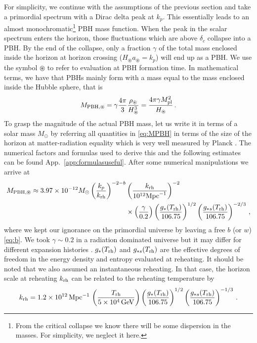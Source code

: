 \documentclass[a4paper,11pt]{article}
\numberwithin{equation}{section}
\begin{document}
For simplicity, we continue with the assumptions of the previous section and take a primordial spectrum with a Dirac delta peak at $k_p$. This essentially leads to an almost monochromatic\footnote{From the critical collapse we know there will be some dispersion in the masses. For simplicity, we neglect it here.} PBH mass function. When the peak in the scalar spectrum enters the horizon, those fluctuations which are above $\delta_c$ collapse into a PBH. By the end of the collapse, only a fraction $\gamma$ of the total mass enclosed inside the horizon at horizon crossing ($H_\circledast a_\circledast=k_p$) will end up as a PBH. We use the symbol $\circledast$ to refer to evaluation at PBH formation time. In mathematical terms, we have that PBHs mainly form with a mass equal to the mass enclosed inside the Hubble sphere, that is
\begin{equation}\label{eq:MPBH}
M_{{\rm PBH},\circledast}=\gamma\frac{4\pi}{3}\frac{\rho_\circledast}{H_\circledast^3}=\frac{4\pi\gamma M_{\rm pl}^2}{H_\circledast}\,.
\end{equation}
To grasp the magnitude of the actual PBH mass, let us write it in terms of a solar mass $M_\odot$ by referring all quantities in \eqref{eq:MPBH} in terms of the size of the horizon at matter-radiation equality which is very well measured by Planck \cite{Aghanim:2018eyx}. The numerical factors and formulas used to derive this and the following estimates can be found App.~\ref{app:formulasuseful}. After some numerical manipulations we arrive at
\begin{align}
M_{{\rm PBH},\circledast}\approx 3.97\times 10^{-12}M_\odot\left(\frac{k_p}{k_{\rm rh}}\right)^{-2-b}&\left(\frac{k_{\rm rh}}{10^{12}{\rm Mpc}^{-1}}\right)^{-2}\nonumber\\&\times\left(\frac{\gamma}{0.2}\right)\left(\frac{g_*(T_{\rm rh})}{106.75}\right)^{1/2}\left(\frac{g_{*s}(T_{\rm rh})}{106.75}\right)^{-2/3}\,,
\end{align}
where we kept our ignorance on the primordial universe by leaving a free $b$
(or $w$) \eqref{eq:b}. We took $\gamma\sim 0.2$ in a radiation dominated universe \cite{Carr:1975qj} but it may differ for different expansion histories \cite{Musco:2004ak,Musco:2008hv,Musco:2012au,Harada:2013epa}. $g_{*}(T_{\rm rh})$ and $g_{*s}(T_{\rm rh})$ are the effective degrees of freedom in the energy density and entropy evaluated at reheating. It should be noted that we also assumed an instantaneous reheating. In that case, the horizon scale at reheating $k_{\rm rh}$ can be related to the reheating temperature by
\begin{align}\label{eq:krh}
k_{\rm rh}=1.2\times 10^{12}\,{\rm Mpc}^{-1}\,\left(\frac{T_{\rm rh}}{5\times 10^4\,{\rm GeV}}\right)\left(\frac{g_*(T_{\rm rh})}{106.75}\right)^{1/2}\left(\frac{g_{*s}(T_{\rm rh})}{106.75}\right)^{-1/3}\,.
\end{align}
\end{document}
